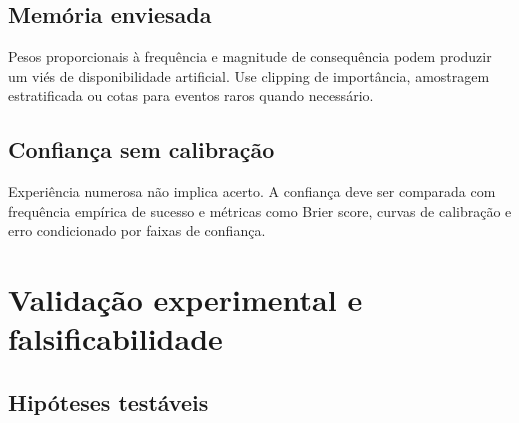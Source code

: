 \subsection{Memória enviesada}

Pesos proporcionais à frequência e magnitude de consequência podem produzir um viés de disponibilidade artificial. Use clipping de importância, amostragem estratificada ou cotas para eventos raros quando necessário.

\subsection{Confiança sem calibração}

Experiência numerosa não implica acerto. A confiança deve ser comparada com frequência empírica de sucesso e métricas como Brier score, curvas de calibração e erro condicionado por faixas de confiança.

\section{Validação experimental e falsificabilidade}

\subsection{Hipóteses testáveis}

